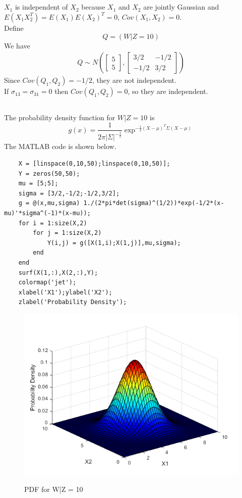 \documentclass{article}
\begin{document}
\subsection{}
$X_1$ is independent of $X_2$ because $X_1$ and $X_2$ are jointly Gaussian and $E(X_1X_2^T)=E(X_1)E(X_2)^T=0$, $Cov(X_1,X_2)=0$.
\\
Define $$Q=(W|Z=10)$$
We have
\begin{align*}
    Q \sim N(
        \begin{bmatrix}
            5\\5
        \end{bmatrix}
        ,
        \begin{bmatrix}
            3/2&-1/2\\
            -1/2&3/2
        \end{bmatrix}
    )
\end{align*}
Since $Cov(Q_1,Q_2)=-1/2$, they are not independent.\\
If $\sigma_{13}=\sigma_{31}=0$ then $Cov(Q_1,Q_2)=0$, so they are independent.

\subsection{}
The probability density function for $W|Z=10$ is
\begin{equation*}
    g(x)=\frac{1}{2\pi |\Sigma|^{-\frac{1}{2}}}\exp^{-\frac{1}{2}(X-\mu)^T\Sigma(X-\mu)}
\end{equation*}
The MATLAB code is shown below.
\begin{lstlisting}
    X = [linspace(0,10,50);linspace(0,10,50)];
    Y = zeros(50,50);
    mu = [5;5];
    sigma = [3/2,-1/2;-1/2,3/2];
    g = @(x,mu,sigma) 1./(2*pi*det(sigma)^(1/2))*exp(-1/2*(x-mu)'*sigma^(-1)*(x-mu));
    for i = 1:size(X,2)
        for j = 1:size(X,2)
            Y(i,j) = g([X(1,i);X(1,j)],mu,sigma);
        end
    end
    surf(X(1,:),X(2,:),Y);
    colormap('jet');
    xlabel('X1');ylabel('X2');
    zlabel('Probability Density');    
\end{lstlisting}
\begin{figure}[H]
    \centering
        \textsf{\includegraphics[width=0.6\columnwidth]{hw6-1.png}}
        \caption{PDF for W|Z = 10}
        \label{fig: 1}
\end{figure}
\end{document}
